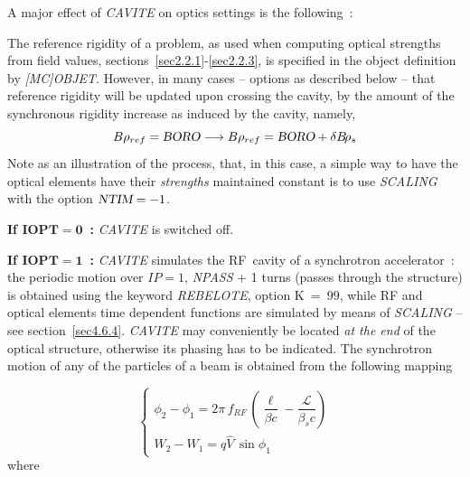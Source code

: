 \bigskip

\noindent A major effect of \textsl{CAVITE} on optics settings is the following~:   

\medskip

\noindent The reference rigidity of a problem, as used when computing optical strengths from field values, 
sections~\ref{sec2.2.1}-\ref{sec2.2.3}, 
 is specified in the object definition by \textsl{[MC]OBJET}.  However, in many 
cases -- options as described below -- that  reference rigidity will be updated upon crossing the cavity, 
by the amount of the synchronous rigidity increase as induced by the cavity, namely, 
$$B\rho_{ref} = \textsl{BORO} \longrightarrow B\rho_{ref} = \textsl{BORO} + \delta B\!\rho_s$$ 
Note as an illustration of the process, that, in this case, a simple way to have the 
optical elements have their \textsl{strengths} maintained constant is to 
use \textsl{SCALING} with the option $\textsl{NTIM}=-1$.

\bigskip

\noindent \textbf{If $\mathbf{IOPT  =  0}$~:}   \textsl{CAVITE} is switched off.  
\bigskip

\noindent\textbf{If $\mathbf{IOPT  =  1}$~:}  \textsl{CAVITE} simulates the RF~cavity of a 
synchrotron accelerator~: 
the periodic motion over $IP  = 1$, \textsl{NPASS} + 1 
turns (passes through the structure) is obtained using the keyword \textsl{REBELOTE}, option 
\mbox{K  =  99},  while  RF  and optical elements  time dependent functions are simulated by means of
\textsl{SCALING} -- see section~\ref{sec4.6.4}. 
 \textsl{CAVITE} may conveniently be located  \textsl{at the end} of the optical 
structure, otherwise its phasing has to be indicated. 
The synchrotron motion of any of the 
\IMAX{} particles of a beam is obtained from  the following mapping 

$$ \left\{ 
\begin{array}{l}
	\phi_ 2-\phi_ 1= 2\pi \, f_{RF}\, 
	     \left(  \dfrac{\ell}{ \beta c} - \dfrac{\mathcal{L} }{ \beta_sc} \right) \\
	W_2-W_1 = q\hat  V\, \sin\phi_ 1  
\end{array}
\right. $$
%
 where
  
